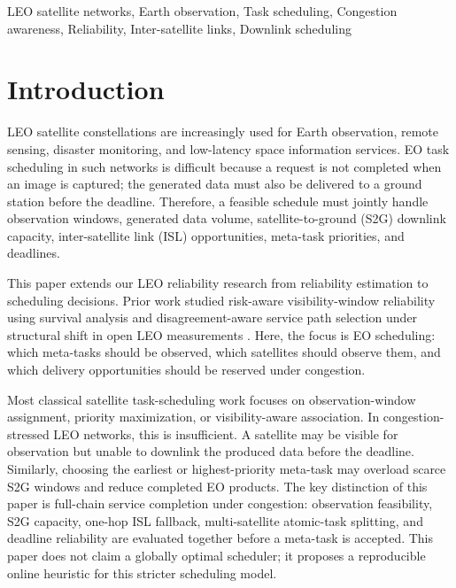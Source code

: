 \documentclass[conference]{IEEEtran}
\begin{document}
\begin{IEEEkeywords}
LEO satellite networks, Earth observation, Task scheduling, Congestion awareness, Reliability, Inter-satellite links, Downlink scheduling
\end{IEEEkeywords}

\section{Introduction}
LEO satellite constellations are increasingly used for Earth observation, remote sensing, disaster monitoring, and low-latency space information services. EO task scheduling in such networks is difficult because a request is not completed when an image is captured; the generated data must also be delivered to a ground station before the deadline. Therefore, a feasible schedule must jointly handle observation windows, generated data volume, satellite-to-ground (S2G) downlink capacity, inter-satellite link (ISL) opportunities, meta-task priorities, and deadlines.

This paper extends our LEO reliability research from reliability estimation to scheduling decisions. Prior work studied risk-aware visibility-window reliability using survival analysis \cite{deepak_visibility} and disagreement-aware service path selection under structural shift in open LEO measurements \cite{deepak_disagreement}. Here, the focus is EO scheduling: which meta-tasks should be observed, which satellites should observe them, and which delivery opportunities should be reserved under congestion.

Most classical satellite task-scheduling work focuses on observation-window assignment, priority maximization, or visibility-aware association. In congestion-stressed LEO networks, this is insufficient. A satellite may be visible for observation but unable to downlink the produced data before the deadline. Similarly, choosing the earliest or highest-priority meta-task may overload scarce S2G windows and reduce completed EO products. The key distinction of this paper is full-chain service completion under congestion: observation feasibility, S2G capacity, one-hop ISL fallback, multi-satellite atomic-task splitting, and deadline reliability are evaluated together before a meta-task is accepted. This paper does not claim a globally optimal scheduler; it proposes a reproducible online heuristic for this stricter scheduling model.
\end{document}
